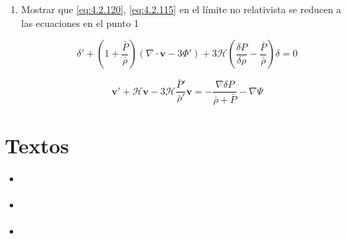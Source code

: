 \documentclass[a4paper]{article}
\begin{document}
\begin{enumerate}
	\item Mostrar que \eqref{eq:4.2.120}, \eqref{eq:4.2.115} en el límite no relativista se reducen a las ecuaciones en el punto 1
	
\begin{equation}
\delta' + \left( 1 + \frac{\bar{P}}{\bar{\rho}} \right) (\nabla \cdot \mathbf{v} - 3\Phi') + 3\mathcal{H} \left( \frac{\delta P}{\delta \rho} - \frac{\bar{P}}{\bar{\rho}} \right) \delta = 0
\tag{4.2.115}
\label{eq:4.2.115}
\end{equation}

\begin{equation}
\mathbf{v}' + \mathcal{H}\mathbf{v} - 3\mathcal{H} \frac{\bar{P}'}{\bar{\rho}'} \mathbf{v} = - \frac{\nabla \delta P}{\bar{\rho} + \bar{P}} - \nabla \Psi
\tag{4.2.120}
\label{eq:4.2.120}
\end{equation}
	
\end{enumerate}

\section{Textos}

\begin{itemize}

	\item \cite{dInvernoVickers2022}
	\item \cite{Riotto2002}
	\item \cite{Naruko2018}

\end{itemize}



 
\end{document}
